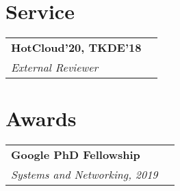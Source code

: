 \documentclass[margin,line]{res}
\begin{document}
\begin{resume}

\section{\sc Service}
\begin{tabular}{@{}p{5.5in}p{4in}}
{\bf HotCloud'20, TKDE'18}\\
{\small\em External Reviewer}\\
\end{tabular}

\section{\sc Awards}
\begin{tabular}{@{}p{5.5in}p{4in}}
{\bf Google PhD Fellowship}\\
{\small\em Systems and Networking, 2019}\\
\end{tabular}

\end{resume}
\end{document}

